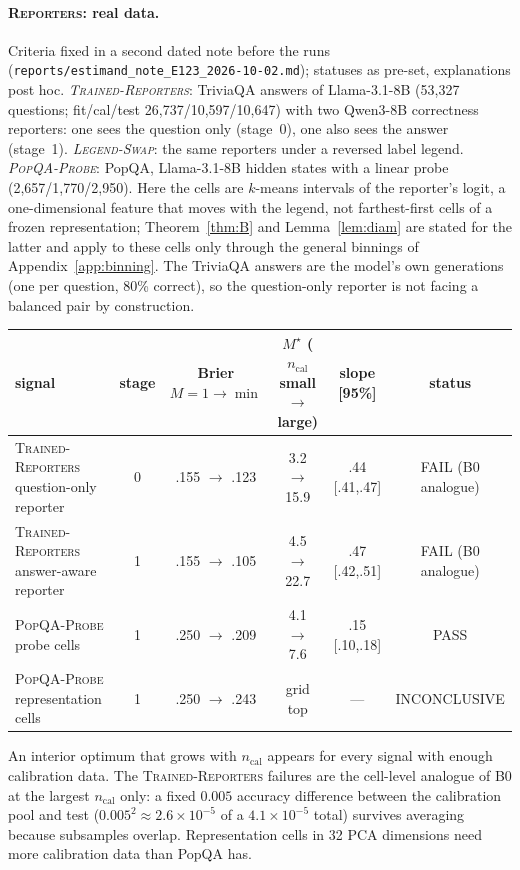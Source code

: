 \documentclass[11pt]{article}
\theoremstyle{definition}
\theoremstyle{remark}
\newcommand{\1}{\mathbf{1}}
\newcommand{\expname}[1]{\textsc{#1}}
\begin{document}
\paragraph{\expname{Reporters}: real data.} Criteria fixed in a second dated note before the runs
(\texttt{reports/estimand\_note\_E123\_2026-10-02.md}); statuses as pre-set, explanations post hoc.
\emph{\expname{Trained-Reporters}}: TriviaQA answers of Llama-3.1-8B (53{,}327 questions; fit/cal/test
26{,}737/10{,}597/10{,}647) with two Qwen3-8B correctness reporters: one sees the question only
(stage~0), one also sees the answer (stage~1). \emph{\expname{Legend-Swap}}: the same reporters under a reversed
label legend. \emph{\expname{PopQA-Probe}}: PopQA, Llama-3.1-8B hidden states with a linear probe (2{,}657/1{,}770/2{,}950).
Here the cells are $k$-means intervals of the reporter's logit, a one-dimensional feature that moves
with the legend, not farthest-first cells of a frozen representation; Theorem~\ref{thm:B} and
Lemma~\ref{lem:diam} are stated for the latter and apply to these cells only through the general
binnings of Appendix~\ref{app:binning}. The TriviaQA answers are the model's own generations (one per
question, 80\% correct), so the question-only reporter is not facing a balanced pair by construction.

\begin{center}\small
\begin{tabular}{lccccc}
\toprule
signal & stage & Brier $M{=}1\to\min$ & $M^\star$ ($n_{\mathrm{cal}}$ small$\to$large) & slope [95\%] & status\\
\midrule
\expname{Trained-Reporters} question-only reporter & 0 & .155 $\to$ .123 & 3.2 $\to$ 15.9 & .44 [.41,.47] & FAIL (B0 analogue)\\
\expname{Trained-Reporters} answer-aware reporter  & 1 & .155 $\to$ .105 & 4.5 $\to$ 22.7 & .47 [.42,.51] & FAIL (B0 analogue)\\
\expname{PopQA-Probe} probe cells            & 1 & .250 $\to$ .209 & 4.1 $\to$ 7.6  & .15 [.10,.18] & PASS\\
\expname{PopQA-Probe} representation cells   & 1 & .250 $\to$ .243 & grid top       & ---           & INCONCLUSIVE\\
\bottomrule
\end{tabular}
\end{center}
An interior optimum that grows with $n_{\mathrm{cal}}$ appears for every signal with enough
calibration data. The \expname{Trained-Reporters} failures are the cell-level analogue of B0 at the largest
$n_{\mathrm{cal}}$ only: a fixed $0.005$ accuracy difference between the calibration pool and test
($0.005^2\approx2.6\times10^{-5}$ of a $4.1\times10^{-5}$ total) survives averaging because
subsamples overlap. Representation cells in 32 PCA dimensions need more calibration data than
PopQA has.
\end{document}
